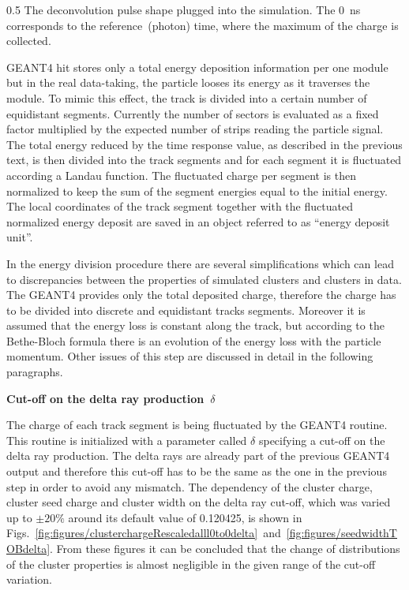                  {0.5}       %
                 { The deconvolution pulse shape plugged into the simulation. The 0~ns corresponds to the reference~(photon) time, where the maximum of the charge is collected.}

GEANT4 hit stores only a total energy deposition information per one module but in the real data-taking, the particle looses its energy as it traverses the module. To mimic this effect, the track is divided into a certain number of equidistant segments. Currently the number of sectors is evaluated as a fixed factor multiplied by the expected number of strips reading the particle signal. The total energy reduced by the time response value, as described in the previous text, is then divided into the track segments and for each segment it is fluctuated according a Landau function. The fluctuated charge per segment is then normalized to keep the sum of the segment energies equal to the initial energy. The local coordinates of the track segment together with the fluctuated normalized energy deposit are saved in an object referred to as ``energy deposit unit''.

In the energy division procedure there are several simplifications which can lead to discrepancies between the properties of simulated clusters and clusters in data. The GEANT4 provides only the total deposited charge, therefore the charge has to be divided into discrete and equidistant tracks segments. Moreover it is assumed that the energy loss is constant along the track, but according to the Bethe-Bloch formula there is an evolution of the energy loss with the particle momentum. Other issues of this step are discussed in detail in the following paragraphs.

\textbf{Cut-off on the delta ray production~$\delta$ }

The charge of each track segment is being fluctuated by the GEANT4 routine. This routine is initialized with a parameter called $\delta$ specifying a cut-off on the delta ray production. The delta rays are already part of the previous GEANT4 output and therefore this cut-off has to be the same as the one in the previous step in order to avoid any mismatch. The dependency of the cluster charge, cluster seed charge and cluster width on the delta ray cut-off, which was varied up to $\pm 20\%$ around its default value of 0.120425, is shown in Figs.~\ref{fig:figures/clusterchargeRescaledalll0to0delta}~and~\ref{fig:figures/seedwidthTOBdelta}. From these figures it can be concluded that the change of distributions of the cluster properties is almost negligible in the given range of the cut-off variation. 

